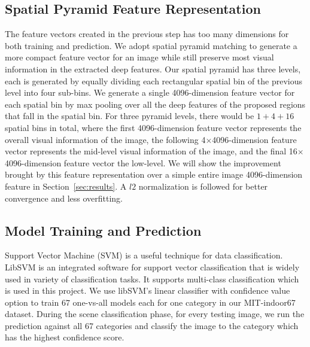 \subsection{Spatial Pyramid Feature Representation}
The feature vectors created in the previous step has too many dimensions for
both training and prediction. We adopt spatial pyramid matching to generate
a more compact feature vector for an image while still preserve most visual
information in the extracted deep features.  Our spatial pyramid has three
levels, each is generated by equally dividing each rectangular spatial bin of
the previous level into four sub-bins. We generate a single 4096-dimension
feature vector for each spatial bin by max pooling over all the deep features
of the proposed regions that fall in the spatial bin. For three pyramid levels,
there would be $1+4+16$ spatial bins in total, where the first 4096-dimension
feature vector represents the overall visual information of the image, the
following 4$\times$4096-dimension feature vector represents the mid-level
visual information of the image, and the final 16$\times$4096-dimension feature
vector the low-level. We will show the improvement brought by this feature
representation over a simple entire image 4096-dimension feature in
Section~\ref{sec:results}. A $l2$ normalization is followed for better
convergence and less overfitting.

\subsection{Model Training and Prediction}
Support Vector Machine (SVM) is a useful technique for data classification.
LibSVM\cite{Chang:2011:CC01a} is an integrated software for support vector
classification that is widely used in variety of classification tasks.  It
supports multi-class classification which is used in this project.  We use
libSVM's linear classifier with confidence value option to train 67 one-vs-all
models each for one category in our MIT-indoor67 dataset. During the scene
classification phase, for every testing image, we run the prediction against
all 67 categories and classify the image to the category which has the highest
confidence score.